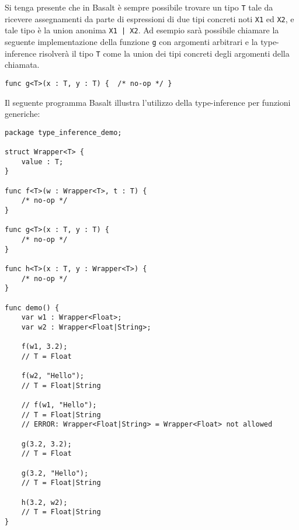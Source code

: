 Si tenga presente che in Basalt è sempre possibile trovare un tipo \texttt{T} tale da ricevere assegnamenti da parte 
di espressioni di due tipi concreti noti \texttt{X1} ed \texttt{X2}, e tale tipo è la union anonima \texttt{X1 | X2}. Ad 
esempio sarà possibile chiamare la seguente implementazione della funzione \texttt{g} con argomenti arbitrari e 
la type-inference risolverà il tipo \texttt{T} come la union dei tipi concreti degli argomenti della chiamata. \\

\vspace{0.5cm}
\begin{lstlisting}[frame=single]
func g<T>(x : T, y : T) {  /* no-op */ }
\end{lstlisting}
\vspace{0.5cm}

\newpage

Il seguente programma Basalt illustra l'utilizzo della type-inference per 
funzioni generiche:

\vspace{0.5cm}
\begin{lstlisting}[frame=single]
package type_inference_demo;

struct Wrapper<T> {
    value : T;
}

func f<T>(w : Wrapper<T>, t : T) { 
    /* no-op */ 
} 

func g<T>(x : T, y : T) { 
    /* no-op */ 
}

func h<T>(x : T, y : Wrapper<T>) { 
    /* no-op */ 
} 

func demo() {
    var w1 : Wrapper<Float>;
    var w2 : Wrapper<Float|String>;
        
    f(w1, 3.2);     
    // T = Float
    
    f(w2, "Hello"); 
    // T = Float|String

    // f(w1, "Hello");  
    // T = Float|String 
    // ERROR: Wrapper<Float|String> = Wrapper<Float> not allowed

    g(3.2, 3.2);     
    // T = Float
    
    g(3.2, "Hello"); 
    // T = Float|String

    h(3.2, w2);      
    // T = Float|String
}
\end{lstlisting}
\vspace{0.5cm}